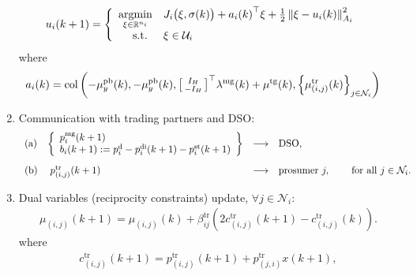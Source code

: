 \documentclass[10pt]{article}
\newcommand{\mc}{\mathcal}
\newcommand{\bb}{\mathbb}
\newcommand{\R}{\bb R}
\newcommand{\argmin}{\operatorname{argmin}}
\newcommand{\col}{\operatorname{col}}
\newcommand{\0}{\mathbf{0}}
\newcommand{\1}{\mathbf{1}}
\begin{document}
\begin{algorithm}[H]
\begin{algorithmic}[1]
\begin{enumerate}[(1)]
	\begin{align*} 
	\textstyle	
	\textstyle
u_i(k+1) &  =
\left\{
\begin{array}{r l}
	\underset{\xi \in \R^{n_i}}{\argmin} & 
	J_{i} \big( \xi, \sigma(k) \big) 
	+ {a_i(k)}^\top \xi + \frac{1}{2}
	\left\| \xi - u_i(k) 
	\textstyle
	  \right\|^2_{A_i} \\
	\text{s.t. } & \xi \in \mc U_i
\end{array} 
	\right.	
	\end{align*}
	where
	\begin{align*}
		a_i(k) &= 
	\col \left(-\mu_y^{\text{pb}}(k),-\mu_y^{\text{pb}}(k),
	{
	\left[
	\begin{smallmatrix}
	I_H\\
	- I_H 
	\end{smallmatrix}
	\right] 
	}^\top \lambda^{\text{mg}}(k) + \mu^{\text{tg}}(k),
	\left\{ {\mu^{\text{tr}}_{(i,j)}(k)}\right\}_{j \in \mc N_i}   \right)
	\end{align*}

\item Communication with trading partners and DSO:
	\begin{align*}	
	\begin{array}{l l c l c}
	\text{(a)} & 
\left\{
\begin{array}{l }
p^{\textrm{mg}}_{i}(k+1) \\ b_i(k+1):= p^{\text{d}}_i-p^{\text{di}}_i(k+1)- p^{\text{st}}_i(k+1)
\end{array}
\right\}
	  &
	\longrightarrow & \text{DSO,} & \\[1.5em]
	\text{(b)} & \; p^{\text{tr}}_{(i,j)}(k+1) &
	\longrightarrow & \text{prosumer }j, & \quad \text{ for all } j \in \mc N_i. 
	\end{array}
	\end{align*}

\item Dual variables (reciprocity constraints) update, $\forall j \in \mc N_i$:
	\vspace*{-.5em}
	\begin{align*}
\mu_{(i,j)}(k+1) = \mu_{(i,j)}(k) + \beta_{ij}^{\text{tr}} \left( 
	2  c^{\text{tr}}_{(i,j)}(k+1) - c^{\text{tr}}_{(i,j)}(k)
	\right).
	\end{align*}
	where
	\begin{align*}
c^{\text{tr}}_{(i,j)}(k+1)  =  p^{\textrm{tr}}_{(i,j)} (k+1) + p^{\textrm{tr}}_{(j,i)}x(k+1), \\
%
	\end{align*}
\end{enumerate}
\EndFor



\end{algorithmic}
\end{algorithm}
\end{document}
